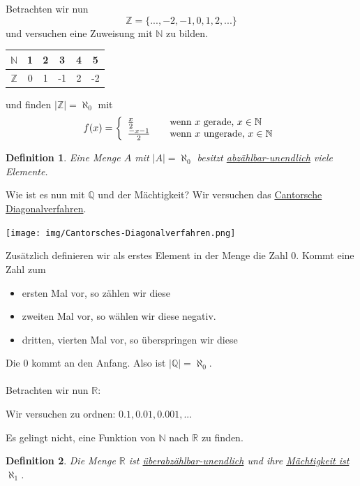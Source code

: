 \documentclass{report}
\newtheorem{mydef}{Definition}
\begin{document}
Betrachten wir nun
\begin{equation}\mathbb{Z} = \{..., -2, -1, 0, 1, 2, ...\}\end{equation}
und versuchen eine Zuweisung mit $\mathbb{N}$ zu bilden.
\begin{center}\begin{tabular}{c | c | c | c | c | c}$\mathbb{N}$ & 1 & 2 & 3 & 4 & 5\\ \hline
$\mathbb{Z}$ & 0 & 1 & -1 & 2 & -2\end{tabular}\end{center}
und finden $|\mathbb{Z}| = \aleph_0$ mit
\[f(x) = \left\{ 
\begin{array}{l l}
  \frac{x}{2} & \quad \mbox{wenn $x$ gerade, $x \in \mathbb{N}$}\\
  \frac{-x-1}{2} & \quad \mbox{wenn $x$ ungerade, $x \in \mathbb{N}$}\\ \end{array} \right. \]
\begin{mydef}Eine Menge $A$ mit $|A| = \aleph_0$ besitzt \underline{abzählbar-unendlich} viele Elemente.\end{mydef}
Wie ist es nun mit $\mathbb{Q}$ und der Mächtigkeit? Wir versuchen das \underline{Cantorsche Diagonalverfahren}.
\begin{center}\texttt{[image: img/Cantorsches-Diagonalverfahren.png]}\end{center}
Zusätzlich definieren wir als erstes Element in der Menge die Zahl 0. Kommt eine Zahl zum
\begin{itemize}
\item ersten Mal vor, so zählen wir diese
\item zweiten Mal vor, so wählen wir diese negativ.
\item dritten, vierten Mal vor, so überspringen wir diese\end{itemize}
Die 0 kommt an den Anfang. Also ist $|\mathbb{Q}| = \aleph_0$.\\\\
Betrachten wir nun $\mathbb{R}$:
\begin{center}Wir versuchen zu ordnen: $0.1, 0.01, 0.001, ...$\end{center}
Es gelingt nicht, eine Funktion von $\mathbb{N}$ nach $\mathbb{R}$ zu finden.
\begin{mydef}Die Menge $\mathbb{R}$ ist \underline{überabzählbar-unendlich} und ihre \underline{Mächtigkeit ist $\aleph_1$}.\end{mydef}
\end{document}
